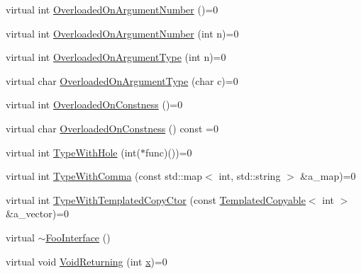 \begin{DoxyCompactItemize}
\item 
virtual int \mbox{\hyperlink{classtesting_1_1gmock__generated__function__mockers__test_1_1_foo_interface_ae9e86ac64fa9acedfb1fa747174c7f43}{Overloaded\+On\+Argument\+Number}} ()=0
\item 
virtual int \mbox{\hyperlink{classtesting_1_1gmock__generated__function__mockers__test_1_1_foo_interface_a1b5ff8cc745af475e0abba5d2858e1c9}{Overloaded\+On\+Argument\+Number}} (int n)=0
\item 
virtual int \mbox{\hyperlink{classtesting_1_1gmock__generated__function__mockers__test_1_1_foo_interface_ad9cc9a11570403fb8378ed6620892ec6}{Overloaded\+On\+Argument\+Type}} (int n)=0
\item 
virtual char \mbox{\hyperlink{classtesting_1_1gmock__generated__function__mockers__test_1_1_foo_interface_a8cb6caa44216ba29fc228b016523abe9}{Overloaded\+On\+Argument\+Type}} (char c)=0
\item 
virtual int \mbox{\hyperlink{classtesting_1_1gmock__generated__function__mockers__test_1_1_foo_interface_afbbe6ec72ae237de05e109dea5b03f4f}{Overloaded\+On\+Constness}} ()=0
\item 
virtual char \mbox{\hyperlink{classtesting_1_1gmock__generated__function__mockers__test_1_1_foo_interface_ab40007385078cdb675616a21ef254df4}{Overloaded\+On\+Constness}} () const =0
\item 
virtual int \mbox{\hyperlink{classtesting_1_1gmock__generated__function__mockers__test_1_1_foo_interface_a9e92ef227dc68806f85ebff9c8a6102a}{Type\+With\+Hole}} (int($\ast$func)())=0
\item 
virtual int \mbox{\hyperlink{classtesting_1_1gmock__generated__function__mockers__test_1_1_foo_interface_a64544adcb9c502a8fbc3990b53f4c767}{Type\+With\+Comma}} (const std\+::map$<$ int, std\+::string $>$ \&a\+\_\+map)=0
\item 
virtual int \mbox{\hyperlink{classtesting_1_1gmock__generated__function__mockers__test_1_1_foo_interface_ac3f47b680d4a46f2a77ebd76b7243187}{Type\+With\+Templated\+Copy\+Ctor}} (const \mbox{\hyperlink{classtesting_1_1gmock__generated__function__mockers__test_1_1_templated_copyable}{Templated\+Copyable}}$<$ int $>$ \&a\+\_\+vector)=0
\item 
virtual \mbox{\hyperlink{classtesting_1_1gmock__generated__function__mockers__test_1_1_foo_interface_ad4eb4709c9ae9b1cdaded8d05567cdbb}{$\sim$\+Foo\+Interface}} ()
\item 
virtual void \mbox{\hyperlink{classtesting_1_1gmock__generated__function__mockers__test_1_1_foo_interface_adf968115cf1260004d8abe372dc71c85}{Void\+Returning}} (int \mbox{\hyperlink{_obj__test_2lib_2googletest-master_2googlemock_2test_2gmock-matchers__test_8cc_a6150e0515f7202e2fb518f7206ed97dc}{x}})=0

\end{DoxyCompactItemize}
